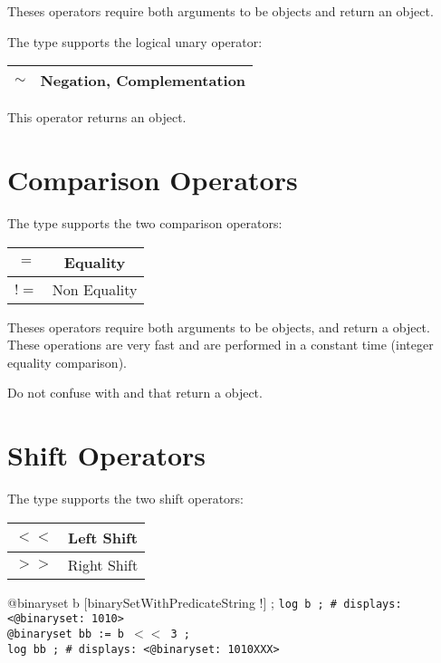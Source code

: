 Theses operators require both arguments to be  objects and return an  object.\newline


The  type supports the logical unary operator:\newline

\begin{tabular}{|c|c|}
\hline
$\sim$ & Negation, Complementation \\
\hline
\end{tabular}

This operator returns an  object.







\section{Comparison Operators}

The  type supports the two comparison operators:\newline

\begin{tabular}{|c|c|}
\hline
$=$ & Equality \\
\hline
$!=$ & Non Equality \\
\hline
\end{tabular}

Theses operators require both arguments to be  objects, and return a  object. These operations are very fast and are performed in a constant time (integer equality comparison).

Do not confuse with  and  that return a  object.







\section{Shift Operators}

The  type supports the two shift operators:\newline

\begin{tabular}{|c|c|}
\hline
$<<$ & Left Shift \\
\hline
$>>$ & Right Shift \\
\hline
\end{tabular}

\exempleUneLigne
{}
{@binaryset b [binarySetWithPredicateString !\textquotedbl] ;}
\texttt{log b ; \# displays: <@binaryset:~1010>}\\
\texttt{@binaryset bb := b $<<$ 3 ;}\\
\texttt{log bb ; \# displays: <@binaryset:~1010XXX>}\\

